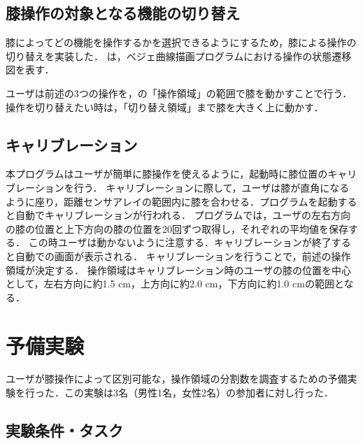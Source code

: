 \documentclass[submit, techrep]{ipsj}
\begin{document}

\subsection{膝操作の対象となる機能の切り替え}
膝によってどの機能を操作するかを選択できるようにするため，膝による操作の切り替えを実装した．
は，ベジェ曲線描画プログラムにおける操作の状態遷移図を表す．

ユーザは前述の3つの操作を，の「操作領域」の範囲で膝を動かすことで行う．操作を切り替えたい時は，「切り替え領域」まで膝を大きく上に動かす．
\subsection{キャリブレーション}
本プログラムはユーザが簡単に膝操作を使えるように，起動時に膝位置のキャリブレーションを行う．
キャリブレーションに際して，ユーザは膝が直角になるように座り，距離センサアレイの範囲内に膝を合わせる．プログラムを起動すると自動でキャリブレーションが行われる．
プログラムでは，ユーザの左右方向の膝の位置と上下方向の膝の位置を20回ずつ取得し，それぞれの平均値を保存する．
この時ユーザは動かないように注意する．キャリブレーションが終了すると自動での画面が表示される．
キャリブレーションを行うことで，前述の操作領域が決定する．
操作領域はキャリブレーション時のユーザの膝の位置を中心として，左右方向に約1.5 \si{cm}，上方向に約2.0 \si{cm}，下方向に約1.0 \si{cm}の範囲となる．




\section{予備実験}
ユーザが膝操作によって区別可能な，操作領域の分割数を調査するための予備実験を行った．この実験は3名（男性1名，女性2名）の参加者に対し行った．

\subsection{実験条件・タスク}
\end{document}
